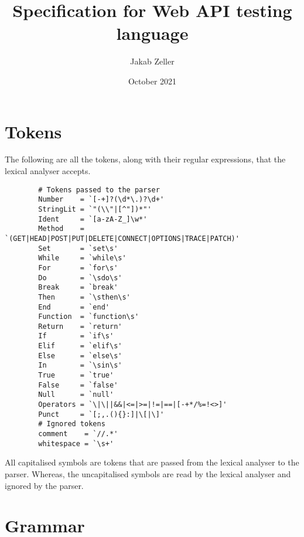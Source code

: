 \documentclass[12pt, letterpaper]{article}
\title{Specification for Web API testing language}
\author{Jakab Zeller}
\date{October 2021}
\begin{document}
\maketitle

\section{Tokens}

The following are all the tokens, along with their regular expressions, that the lexical analyser accepts.

\begin{center}
    \begin{verbatim}
        # Tokens passed to the parser
        Number    = `[-+]?(\d*\.)?\d+'
        StringLit = `"(\\"|[^"])*"'
        Ident     = `[a-zA-Z_]\w*'
        Method    = `(GET|HEAD|POST|PUT|DELETE|CONNECT|OPTIONS|TRACE|PATCH)'
        Set       = `set\s'
        While     = `while\s'
        For       = `for\s'
        Do        = `\sdo\s'
        Break     = `break'
        Then      = `\sthen\s'
        End       = `end'
        Function  = `function\s'
        Return    = `return'
        If        = `if\s'
        Elif      = `elif\s'
        Else      = `else\s'
        In        = `\sin\s'
        True      = `true'
        False     = `false'
        Null      = `null'
        Operators = `\|\||&&|<=|>=|!=|==|[-+*/%=!<>]'
        Punct     = `[;,.(){}:]|\[|\]'
        # Ignored tokens
        comment    = `//.*'
        whitespace = `\s+'
    \end{verbatim}
\end{center}

All capitalised symbols are tokens that are passed from the lexical analyser to the parser. Whereas, the uncapitalised symbols are read by the lexical analyser and ignored by the parser.

\section{Grammar}
\end{document}
